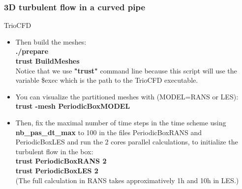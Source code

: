 \documentclass[10pt]{beamer}
\begin{document}
\begin{frame}
\frametitle{3D turbulent flow in a curved pipe}
\begin{block}{TrioCFD}

\begin{itemize}
\item Then build the meshes:\\
\textbf{./prepare} \\
\textbf{trust BuildMeshes} \\
Notice that we use \textbf{"trust"} command line because this script will use the variable \$exec which is the path to the TrioCFD executable.

\item You can visualize the partitioned meshes with (MODEL=RANS or LES): \\
\textbf{trust -mesh PeriodicBoxMODEL}

\item Then, fix the maximal number of time steps in the time scheme using \textbf{nb\_pas\_dt\_max} to 100 in the files PeriodicBoxRANS and PeriodicBoxLES and run the 2 cores parallel calculations, to initialize the turbulent flow in the box: \\
\textbf{trust PeriodicBoxRANS 2} \\
\textbf{trust PeriodicBoxLES 2} \\
(The full calculation in RANS takes approximatively 1h and 10h in LES.)
\end{itemize}

\end{block}
\end{frame}
\end{document}
